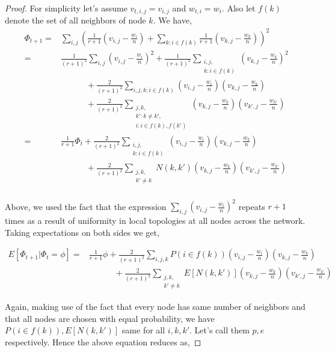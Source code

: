 \documentclass[runningheads,a4paper]{llncs}
\begin{document}
\begin{proof}
For simplicity let's assume $v_{t,i,j}=v_{i,j}$ and $w_{t,i}=w_i$. Also let $f(k)$ denote the set of all neighbors of node $k$. We have, \\
\begin{align*}
\Phi_{t+1} =& \sum\limits_{i,j} \left( \frac{1}{r+1}(v_{i,j}-\frac{w_i}{n}) + \sum\limits_{k:i \in f(k)} \frac{1}{r+1} (v_{k,j}-\frac{w_k}{n}) \right)^2  \\
=& \frac{1}{(r+1)^2} \sum\limits_{i,j} (v_{i,j}-\frac{w_i}{n})^2 + \frac{1}{(r+1)^2} \sum\limits_{\substack{i,j,\\ k:i \in f(k)}} (v_{k,j}-\frac{w_k}{n})^2 \\
&\qquad\quad+ \frac{2}{(r+1)^2} \sum\limits_{i,j,k:i \in f(k)} (v_{i,j}-\frac{w_i}{n})(v_{k,j}-\frac{w_k}{n}) \\
&\qquad\quad+ \frac{2}{(r+1)^2} \sum\limits_{\substack{j,k, \\ k':k \neq k', \\ i:i \in f(k),f(k')}} (v_{k,j}-\frac{w_k}{n})(v_{k',j}-\frac{w_{k'}}{n}) \\
=& \frac{1}{r+1}\Phi_t + \frac{2}{(r+1)^2}\sum\limits_{\substack{i,j,\\ k:i \in f(k)}} (v_{i,j}-\frac{w_i}{n})(v_{k,j}-\frac{w_k}{n}) \\
&\qquad\quad+\frac{2}{(r+1)^2} \sum\limits_{\substack{j,k,\\ k' \neq k}}N(k,k')(v_{k,j}-\frac{w_k}{n})(v_{k',j}-\frac{w_{k'}}{n}) \\
\end{align*}

Above, we used the fact that the expression $\sum\limits_{i,j}(v_{i,j}-\frac{w_i}{n})^2$ repeats $r+1$ times as a result of uniformity in local topologies at all nodes across the network. Taking expectations on both sides we get,

\begin{align*}
E[\Phi_{t+1}|\Phi_t=\phi] =& \frac{1}{r+1}\phi + \frac{2}{(r+1)^2} \sum\limits_{i,j,k}P(i \in f(k))(v_{i,j}-\frac{w_i}{n})(v_{k,j}-\frac{w_k}{n}) \\
&\qquad\quad+ \frac{2}{(r+1)^2} \sum\limits_{\substack{j,k, \\ k' \neq k}} E[N(k,k')] (v_{k,j}-\frac{w_k}{n})(v_{k',j}-\frac{w_{k'}}{n}) 
\end{align*}

Again, making use of the fact that every node has same number of neighbors and that all nodes are chosen with equal probability, we have $P(i \in f(k)),E[N(k,k')]$ same for all $i,k,k'$. Let's call them $p,e$ respectively. Hence the above equation reduces as,


\end{proof}
\end{document}
